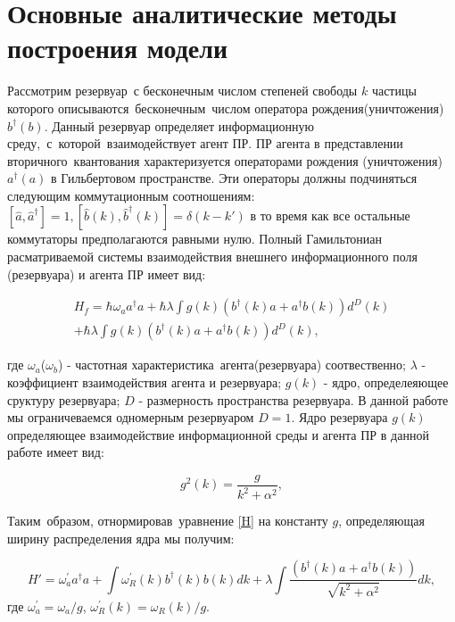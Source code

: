 \chapter{Основные аналитические методы построения модели}
\label{cha:appendix1}

Рассмотрим резервуар~с бесконечным числом степеней свободы $k$ частицы которого описываются~бесконечным~числом
оператора рождения(уничтожения) $b^\dagger(b)$.
Данный резервуар определяет информационную среду,~с~которой~взаимодействует агент ПР.
ПР агента в представлении вторичного~квантования характеризуется операторами рождения (уничтожения)
$a^\dagger(a)$ в Гильбертовом пространстве.
Эти операторы должны подчиняться следующим коммутационным соотношениям:
$
[\hat{a}, \hat{a}^{\dagger}] = 1,
[\hat{b}(k), \hat{b}^{\dagger}(k)] = \delta (k-k')
$
в то время как все остальные коммутаторы предполагаются равными нулю.
Полный Гамильтониан расматриваемой системы взаимодействия внешнего информационного поля (резервуара) и агента ПР имеет вид:

\begin{multline}\label{H}
H_f = \hbar \omega_a a^{\dagger} a + \hbar \lambda \int g(k) (b^{\dagger}(k) a + a^{\dagger} b(k)) d^{D}(k) \\
+ \hbar \lambda \int g(k) (b^{\dagger}(k) a + a^{\dagger} b(k)) d^{D}(k),
\end{multline}

где ${\omega_a}$($\omega_b$) - частотная характеристика~агента(резервуара) соотвественно; $\lambda$
- коэффициент взаимодействия агента и резервуара; $g(k)$ - ядро, определеяющее сруктуру резервуара;
$D$ - размерность пространства резервуара.
В данной работе мы ограничеваемся одномерным резервуаром $D=1$.
Ядро резервуара $g(k)$ определяющее взаимодействие информационной среды и агента ПР в данной работе имеет вид:

\begin{equation}
    g^{2}(k) = \frac{g}{k^{2} + \alpha^{2}},
\end{equation}

Таким~образом, отнормировав~уравнение \eqref{H} на константу $g$, определяющая ширину распределения
ядра мы получим:

\begin{equation}\label{H'}
H' =  \omega^{'}_a a^{\dagger} a +  \int \omega^{'}_{R}(k) b^{\dagger}(k) b(k) dk+ \lambda \int \frac{(b^{\dagger}(k) a + a^{\dagger} b(k))}{\sqrt{k^{2} + \alpha^{2}}} dk,
\end{equation}
где $\omega^{'}_a = \omega_a/g$, $\omega^{'}_{R}(k) = \omega_{R}(k)/g$.


